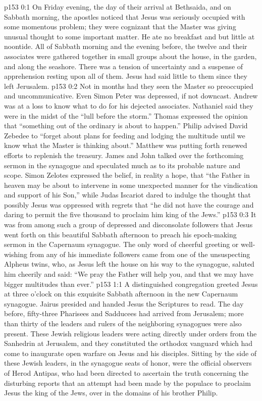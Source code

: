 \author{Midwayer Commission}
\vs p153 0:1 On Friday evening, the day of their arrival at Bethsaida, and on Sabbath morning, the apostles noticed that Jesus was seriously occupied with some momentous problem; they were cognizant that the Master was giving unusual thought to some important matter. He ate no breakfast and but little at noontide. All of Sabbath morning and the evening before, the twelve and their associates were gathered together in small groups about the house, in the garden, and along the seashore. There was a tension of uncertainty and a suspense of apprehension resting upon all of them. Jesus had said little to them since they left Jerusalem.
\vs p153 0:2 Not in months had they seen the Master so preoccupied and uncommunicative. Even Simon Peter was depressed, if not downcast. Andrew was at a loss to know what to do for his dejected associates. Nathaniel said they were in the midst of the “lull before the storm.” Thomas expressed the opinion that “something out of the ordinary is about to happen.” Philip advised David Zebedee to “forget about plans for feeding and lodging the multitude until we know what the Master is thinking about.” Matthew was putting forth renewed efforts to replenish the treasury. James and John talked over the forthcoming sermon in the synagogue and speculated much as to its probable nature and scope. Simon Zelotes expressed the belief, in reality a hope, that “the Father in heaven may be about to intervene in some unexpected manner for the vindication and support of his Son,” while Judas Iscariot dared to indulge the thought that possibly Jesus was oppressed with regrets that “he did not have the courage and daring to permit the five thousand to proclaim him king of the Jews.”
\vs p153 0:3 It was from among such a group of depressed and disconsolate followers that Jesus went forth on this beautiful Sabbath afternoon to preach his epoch\hyp{}making sermon in the Capernaum synagogue. The only word of cheerful greeting or well\hyp{}wishing from any of his immediate followers came from one of the unsuspecting Alpheus twins, who, as Jesus left the house on his way to the synagogue, saluted him cheerily and said: “We pray the Father will help you, and that we may have bigger multitudes than ever.”
\vs p153 1:1 A distinguished congregation greeted Jesus at three o’clock on this exquisite Sabbath afternoon in the new Capernaum synagogue. Jairus presided and handed Jesus the Scriptures to read. The day before, fifty\hyp{}three Pharisees and Sadducees had arrived from Jerusalem; more than thirty of the leaders and rulers of the neighboring synagogues were also present. These Jewish religious leaders were acting directly under orders from the Sanhedrin at Jerusalem, and they constituted the orthodox vanguard which had come to inaugurate open warfare on Jesus and his disciples. Sitting by the side of these Jewish leaders, in the synagogue seats of honor, were the official observers of Herod Antipas, who had been directed to ascertain the truth concerning the disturbing reports that an attempt had been made by the populace to proclaim Jesus the king of the Jews, over in the domains of his brother Philip.
